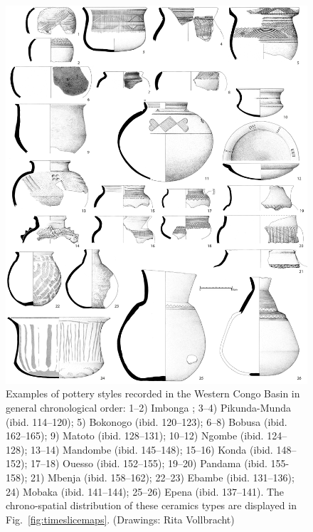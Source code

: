 \documentclass[smallextended,natbib]{svjour3}       %
\begin{document}
\begin{figure}[p]
	\includegraphics[width=\textwidth]{Fig_Sangha_Typen.pdf}
	\caption{Examples of pottery styles recorded in the Western Congo Basin in general chronological order: 1--2) Imbonga \citep[169--172]{Seidensticker.2021e}; 3--4) Pikunda-Munda (ibid. 114--120); 5) Bokonogo (ibid. 120--123); 6--8) Bobusa (ibid. 162--165); 9) Matoto (ibid. 128--131); 10--12) Ngombe (ibid. 124--128); 13--14) Mandombe (ibid. 145--148); 15--16) Konda (ibid. 148--152); 17--18) Ouesso (ibid. 152--155); 19--20) Pandama (ibid. 155-158); 21) Mbenja (ibid. 158--162); 22--23) Ebambe (ibid. 131--136); 24) Mobaka (ibid. 141--144); 25--26) Epena (ibid. 137--141). The chrono-spatial distribution of these ceramics types are displayed in Fig.~\ref{fig:timeslicemaps}. (Drawings: Rita Vollbracht)}
	\label{fig:sangahtypes}
\end{figure}
\end{document}
